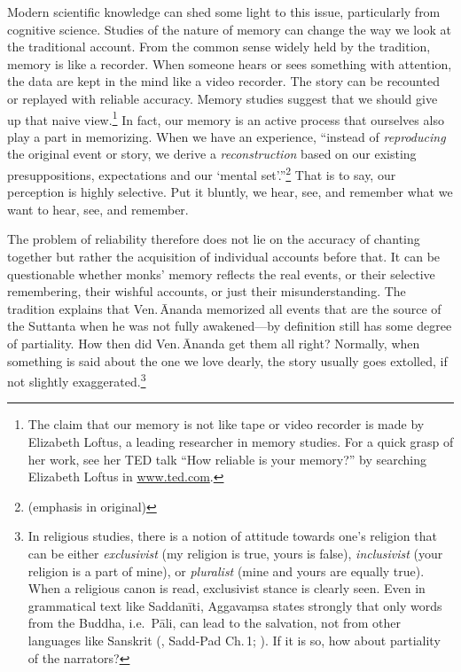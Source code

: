 Modern scientific knowledge can shed some light to this issue, particularly from cognitive science. Studies of the nature of memory can change the way we look at the traditional account. From the common sense widely held by the tradition, memory is like a recorder. When someone hears or sees something with attention, the data are kept in the mind like a video recorder. The story can be recounted or replayed with reliable accuracy. Memory studies suggest that we should give up that naive view.\footnote{The claim that our memory is not like tape or video recorder is made by Elizabeth Loftus, a leading researcher in memory studies. For a quick grasp of her work, see her TED talk ``How reliable is your memory?'' by searching Elizabeth Loftus in \url{www.ted.com}.} In fact, our memory is an active process that ourselves also play a part in memorizing. When we have an experience, ``instead of \emph{reproducing} the original event or story, we derive a \emph{reconstruction} based on our existing presuppositions, expectations and our `mental set'.''\footnote{\citealp[p.~12]{foster:memory} (emphasis in original)} That is to say, our perception is highly selective. Put it bluntly, we hear, see, and remember what we want to hear, see, and remember.

The problem of reliability therefore does not lie on the accuracy of chanting together but rather the acquisition of individual accounts before that. It can be questionable whether monks' memory reflects the real events, or their selective remembering, their wishful accounts, or just their misunderstanding. The tradition explains that Ven.\,\=Ananda memorized all events that are the source of the Suttanta when he was not fully awakened---by definition still has some degree of partiality. How then did Ven.\,\=Ananda get them all right? Normally, when something is said about the one we love dearly, the story usually goes extolled, if not slightly exaggerated.\footnote{In religious studies, there is a notion of attitude towards one's religion that can be either \emph{exclusivist} (my religion is true, yours is false), \emph{inclusivist} (your religion is a part of mine), or \emph{pluralist} (mine and yours are equally true). When a religious canon is read, exclusivist stance is clearly seen. Even in grammatical text like Saddan\=iti, Aggava\d msa states strongly that only words from the Buddha, i.e.\ P\=ali, can lead to the salvation, not from other languages like Sanskrit (, Sadd-Pad Ch.\,1; \citealp[p.~8]{smith:sadd1}). If it is so, how about partiality of the narrators?}

